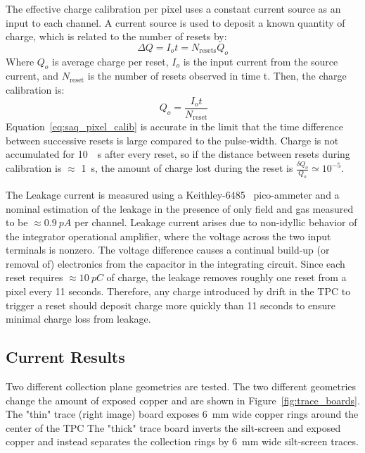 The effective charge calibration per pixel uses a constant current source as an input to each channel.
A current source is used to deposit a known quantity of charge, which is related to the number of resets by:
\begin{equation}
 \Delta Q = I_{o}t = N_{\mathrm{resets}}Q_{o}
\end{equation}
Where $Q_{o}$ is average charge per reset, $I_{o}$ is the input current from the source current, and $N_{\mathrm{reset}}$ is the number of resets observed in time t.
Then, the charge calibration is:
\begin{equation}~\label{eq:saq_pixel_calib}
 Q_{o} = \frac{I_{o}t}{N_{\mathrm{reset}}}
\end{equation}
Equation~\ref{eq:saq_pixel_calib} is accurate in the limit that the time difference between successive resets is large compared to the pulse-width.
Charge is not accumulated for 10~\unit{\mu s} after every reset, so if the distance between resets during calibration is $\approx$ 1~\unit{s}, the amount of charge lost during the reset is $\frac{\delta Q_{o}}{Q_{o}} \simeq 10^{-5}$.

The Leakage current is measured using a Keithley-6485~\citep{picoammeter-6485-datasheet} pico-ammeter and a nominal estimation of the leakage in the presence of only field and gas measured to be $\approx 0.9~\unit{pA}$ per channel.
Leakage current arises due to non-idyllic behavior of the integrator operational amplifier, where the voltage across the two input terminals is nonzero.
The voltage difference causes a continual build-up (or removal of) electronics from the capacitor in the integrating circuit.
Since each reset requires $\approx 10~\unit{pC}$ of charge, the leakage removes roughly one reset from a pixel every 11 seconds.
Therefore, any charge introduced by drift in the TPC to trigger a reset should deposit charge more quickly than 11 seconds to ensure minimal charge loss from leakage.


\subsection{Current Results}

Two different collection plane geometries are tested.
The two different geometries change the amount of exposed copper and are shown in Figure~\ref{fig:trace_boards}.
The "thin" trace (right image) board exposes 6~\unit{mm} wide copper rings around the center of the TPC
The "thick" trace board inverts the silt-screen and exposed copper and instead separates the collection rings by 6~\unit{mm} wide silt-screen traces.

